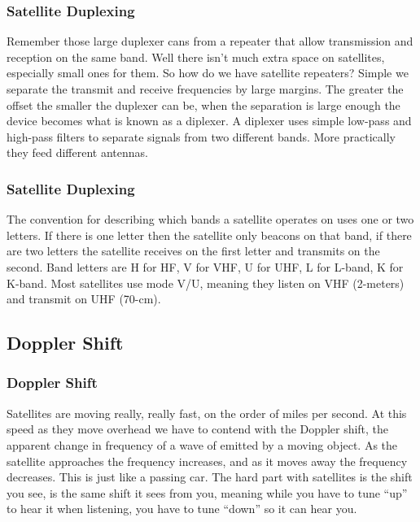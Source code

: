 \documentclass[10pt]{beamer}
\begin{document}
\begin{frame}
\frametitle{Satellite Duplexing}
Remember those large duplexer cans from a repeater that allow transmission and reception on the same band. Well there isn't much extra space on satellites, especially small ones for them. So how do we have satellite repeaters? Simple we separate the transmit and receive frequencies by large margins. The greater the offset the smaller the duplexer can be, when the separation is large enough the device becomes what is known as a diplexer. A diplexer uses simple low-pass and high-pass filters to separate signals from two different bands. More practically they feed different antennas.
\end{frame}

\begin{frame}
\frametitle{Satellite Duplexing}
The convention for describing which bands a satellite operates on uses one or two letters. If there is one letter then the satellite only beacons on that band, if there are two letters the satellite receives on the first letter and transmits on the second. Band letters are H for HF, V for VHF, U for UHF, L for L-band, K for K-band.  Most satellites use mode V/U, meaning they listen on VHF (2-meters) and transmit on UHF (70-cm).
\end{frame}

\subsection{Doppler Shift}
\begin{frame}
\frametitle{Doppler Shift}
Satellites are moving really, really fast, on the order of miles per second. At this speed as they move overhead we have to contend with the Doppler shift, the apparent change in frequency of a wave of emitted by a moving object. As the satellite approaches the frequency increases, and as it moves away the frequency decreases. This is just like a passing car. The hard part with satellites is the shift you see, is the same shift it sees from you, meaning while you have to tune ``up'' to hear it when listening, you have to tune ``down'' so it can hear you.
\end{frame}
\end{document}
